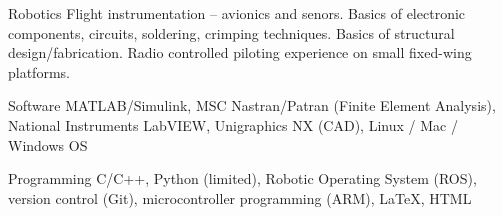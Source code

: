 

\begin{cvleftskills}

  \cvleftskill
    {Robotics} %
    {Flight instrumentation -- avionics and senors. Basics of electronic components, circuits, soldering, crimping techniques. Basics of structural design/fabrication. Radio controlled piloting experience on small fixed-wing platforms.}

  \cvleftskill
    {Software} %
    {MATLAB/Simulink, MSC Nastran/Patran (Finite Element Analysis), National Instruments LabVIEW, Unigraphics NX (CAD), Linux / Mac / Windows OS} %

  \cvleftskill
    {Programming} %
    {C/C++, Python (limited), Robotic Operating System (ROS), version control (Git), microcontroller programming (ARM), \LaTeX, HTML} %


\end{cvleftskills}